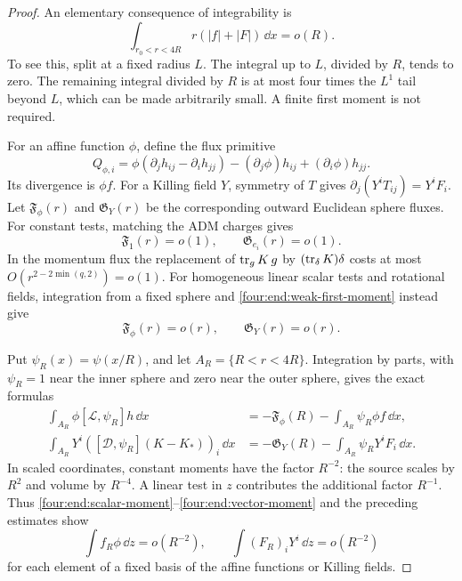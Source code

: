 \begin{proof}
An elementary consequence of integrability is
\begin{equation}\label{four:end:weak-first-moment}
 \int_{r_0<r<4R}r(|f|+|F|)\,\dd x=o(R).
\end{equation}
To see this, split at a fixed radius \(L\). The integral up to \(L\),
divided by \(R\), tends to zero. The remaining integral divided by
\(R\) is at most four times the \(L^1\) tail beyond \(L\), which can
be made arbitrarily small. A finite first moment is not required.

For an affine function \(\phi\), define the flux primitive
\[
 Q_{\phi,i}
 =\phi(\partial_jh_{ij}-\partial_i h_{jj})
       -(\partial_j\phi)h_{ij}+(\partial_i\phi)h_{jj}.
\]
Its divergence is \(\phi f\). For a Killing field \(Y\), symmetry
of \(T\) gives \(\partial_j(Y^iT_{ij})=Y^iF_i\).
Let \(\mathfrak F_\phi(r)\) and \(\mathfrak G_Y(r)\) be the corresponding
outward Euclidean sphere fluxes. For constant tests, matching the ADM
charges gives
\[
 \mathfrak F_1(r)=o(1),\qquad
 \mathfrak G_{e_i}(r)=o(1).
\]
In the momentum flux the replacement of \(\operatorname{tr}_gK\,g\) by
\((\operatorname{tr}_\delta K)\delta\) costs at most
\(O(r^{2-2\min(q,2)})=o(1)\). For homogeneous linear scalar tests and
rotational fields, integration from a fixed sphere and
\eqref{four:end:weak-first-moment} instead give
\[
 \mathfrak F_\phi(r)=o(r),\qquad \mathfrak G_Y(r)=o(r).
\]

Put \(\psi_R(x)=\psi(x/R)\), and let \(A_R=\{R<r<4R\}\).
Integration by parts, with \(\psi_R=1\) near the inner sphere and zero
near the outer sphere, gives the exact formulas
\begin{align}
 \int_{A_R}\phi[\mathcal L,\psi_R]h\,\dd x
  &=-\mathfrak F_\phi(R)-\int_{A_R}\psi_R\phi f\,\dd x,
       \label{four:end:scalar-moment}\\
 \int_{A_R}Y^i([\mathcal D,\psi_R](K-K_*))_i\,\dd x
  &=-\mathfrak G_Y(R)-\int_{A_R}\psi_RY^iF_i\,\dd x.
       \label{four:end:vector-moment}
\end{align}
In scaled coordinates, constant moments have the factor \(R^{-2}\):
the source scales by \(R^2\) and volume by \(R^{-4}\).
A linear test in \(z\) contributes the additional factor \(R^{-1}\).
Thus \eqref{four:end:scalar-moment}--\eqref{four:end:vector-moment} and the preceding
estimates show
\begin{equation}\label{four:end:small-moments}
 \int f_R\phi\,\dd z=o(R^{-2}),\qquad
 \int (F_R)_iY^i\,\dd z=o(R^{-2})
\end{equation}
for each element of a fixed basis of the affine functions or Killing
fields.


\end{proof}

